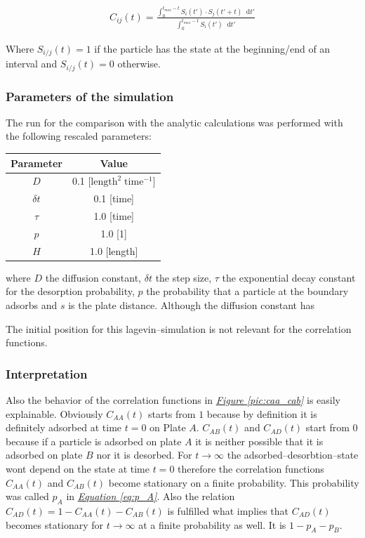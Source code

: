 \documentclass[a4paper, parskip=half]{scrartcl}
\newcommand{\diff}{\mathop{}\!\mathrm{d}}
\newcommand{\myFigRef}[1]{\textit{\hyperref[#1]{Figure \ref*{#1}}}}
\newcommand{\myEqRef}[1]{\textit{\hyperref[eq:#1]{Equation \ref*{eq:#1}}}}
\begin{document}
\begin{align}
  C_{ij}(t) = \frac{\int_0^{t_{max}-t} S_i(t') \cdot S_j(t' + t) \diff t'}{\int_0^{t_{max}-t} S_i(t') \diff t'}
\end{align}

Where $S_{i/j}(t) = 1$ if the particle has the state at the beginning/end of an interval and $S_{i/j}(t) = 0$ otherwise.

\subsubsection{Parameters of the simulation}\label{parameters}
The run for the comparison with the analytic calculations was performed with the following rescaled parameters:
\begin{center}
\begin{tabular}{c|c}
Parameter & Value \\\hline
$D$ & 0.1  [$\mathrm{length}^2\; \mathrm{time}^{-1}$] \\
$\delta t$  & 0.1 [time] \\
$\tau$ & 1.0 [time]\\
$p$ & 1.0 [1]\\
$H$ & 1.0 [length] 
\end{tabular}
\end{center}

where $D$ the diffusion constant, $\delta t$ the step size, $\tau$ the exponential decay constant for the desorption probability, $p$ the probability that a particle at the boundary adsorbs and $s$ is the plate distance. Although the diffusion constant has 

The initial position for this lagevin--simulation is not relevant for the correlation functions. 

\subsubsection{Interpretation}\label{interpretation}

Also the behavior of the correlation functions in \myFigRef{pic:caa_cab} is easily explainable. Obviously $C_{AA}(t)$ starts from $1$ because by definition it is definitely adsorbed at time $t=0$ on Plate $A$. $C_{AB}(t)$ and $C_{AD}(t)$ start from $0$ because if a particle is adsorbed on plate $A$ it is neither possible that it is adsorbed on plate $B$ nor it is desorbed. For $t \rightarrow \infty$ the adsorbed--desorbtion--state wont depend on the state at time $t = 0$ therefore the correlation functions $C_{AA}(t)$ and $C_{AB}(t)$ become stationary on a finite probability. This probability was called $p_A$ in \myEqRef{p_A}. Also the relation $C_{AD}(t) = 1 - C_{AA}(t) - C_{AB}(t)$ is fulfilled what implies that $C_{AD}(t)$ becomes stationary for $t \rightarrow \infty$ at a finite probability as well. It is $1 - p_A - p_B$.
\end{document}
